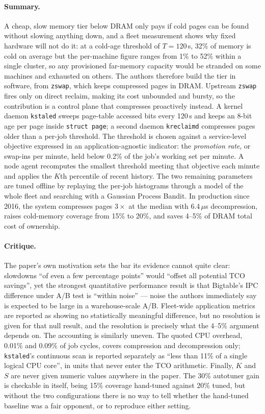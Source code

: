 \paragraph{Summary.}
A cheap, slow memory tier below DRAM only pays if cold pages can be found without
slowing anything down, and a fleet measurement shows why fixed hardware will not do it:
at a cold-age threshold of $T=120$\,s, 32\% of memory is cold on average but the
per-machine figure ranges from 1\% to 52\% within a single cluster, so any provisioned
far-memory capacity would be stranded on some machines and exhausted on others. The
authors therefore build the tier in software, from \texttt{zswap}, which keeps
compressed pages in DRAM. Upstream \texttt{zswap} fires only on direct reclaim, making
its cost unbounded and bursty, so the contribution is a control plane that compresses
proactively instead. A kernel daemon \texttt{kstaled} sweeps page-table accessed bits
every 120\,s and keeps an 8-bit age per page inside \texttt{struct page}; a second
daemon \texttt{kreclaimd} compresses pages older than a per-job threshold. The threshold
is chosen against a service-level objective expressed in an application-agnostic
indicator: the \emph{promotion rate}, or swap-ins per minute, held below 0.2\% of the
job's working set per minute. A node agent recomputes the smallest threshold meeting
that objective each minute and applies the $K$th percentile of recent history. The two
remaining parameters are tuned offline by replaying the per-job histograms through a
model of the whole fleet and searching with a Gaussian Process Bandit. In production
since 2016, the system compresses pages $3\times$ at the median with 6.4\,$\mu$s
decompression, raises cold-memory coverage from 15\% to 20\%, and saves 4--5\% of DRAM
total cost of ownership.

\paragraph{Critique.}
The paper's own motivation sets the bar its evidence cannot quite clear: slowdowns ``of
even a few percentage points'' would ``offset all potential TCO savings'', yet the
strongest quantitative performance result is that Bigtable's IPC difference under A/B
test is ``within noise'' --- noise the authors immediately say is expected to be large in
a warehouse-scale A/B. Fleet-wide application metrics are reported as showing no
statistically meaningful difference, but no resolution is given for that null result, and
the resolution is precisely what the 4--5\% argument depends on. The accounting is
similarly uneven. The quoted CPU overhead, 0.01\% and 0.09\% of job cycles, covers
compression and decompression only; \texttt{kstaled}'s continuous scan is reported
separately as ``less than 11\% of a single logical CPU core'', in units that never enter
the TCO arithmetic. Finally, $K$ and $S$ are never given numeric values anywhere in the
paper. The 30\% autotuner gain is checkable in itself, being 15\% coverage hand-tuned
against 20\% tuned, but without the two configurations there is no way to tell whether the
hand-tuned baseline was a fair opponent, or to reproduce either setting.

